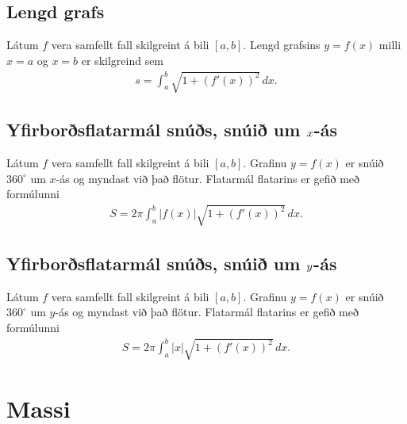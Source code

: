 \documentclass[b5paper,11pt,icelandic]{sphinxmanual}
\begin{document}
\subsection{Lengd grafs}
\label{kafli07:lengd-grafs}
Látum \(f\) vera samfellt fall skilgreint á bili \([a, b]\).
Lengd grafsins \(y=f(x)\) milli \(x=a\) og \(x=b\) er
skilgreind sem
\begin{equation*}
\begin{split}s=\int_a^b\sqrt{1+(f'(x))^2}\,dx.\end{split}
\end{equation*}

\subsection{Yfirborðsflatarmál snúðs, snúið um \protect\(x\protect\)-ás}
\label{kafli07:yfirborsflatarmal-snus-snui-um-as}\label{kafli07:index-7}
Látum \(f\) vera samfellt fall skilgreint á bili \([a, b]\).
Grafinu \(y=f(x)\) er snúið \(360^\circ\) um \(x\)-ás og
myndast við það flötur. Flatarmál flatarins er gefið með formúlunni
\begin{equation*}
\begin{split}S=2\pi\int_a^b|f(x)|\sqrt{1+(f'(x))^2}\,dx.\end{split}
\end{equation*}

\subsection{Yfirborðsflatarmál snúðs, snúið um \protect\(y\protect\)-ás}
\label{kafli07:id3}\label{kafli07:index-8}
Látum \(f\) vera samfellt fall skilgreint á bili \([a, b]\).
Grafinu \(y=f(x)\) er snúið \(360^\circ\) um \(y\)-ás og
myndast við það flötur. Flatarmál flatarins er gefið með formúlunni
\begin{equation*}
\begin{split}S=2\pi\int_a^b|x|\sqrt{1+(f'(x))^2}\,dx.\end{split}
\end{equation*}

\section{Massi}
\label{kafli07:index-9}\label{kafli07:massi}
\end{document}
